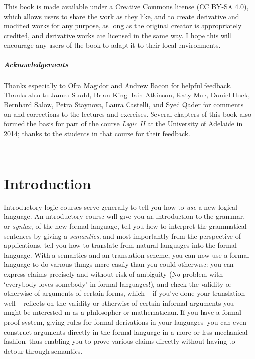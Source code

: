 \documentclass[openany,leqno,11pt,draft]{book}
\theoremstyle{break}
\theoremstyle{definition}
\theoremstyle{remark}
\begin{document}
This book is made available under a Creative Commons license (CC BY-SA 4.0), which allows users to share the work as they like, and to create derivative and modified works for any purpose, as long as the original creator is appropriately credited, and derivative works are licensed in the same way. I hope this will encourage any users of the book to adapt it to their local environments.

\paragraph{Acknowledgements} Thanks especially to Ofra Magidor and Andrew Bacon for helpful feedback. Thanks also to James Studd, Brian King, Iain Atkinson, Katy Moe, Daniel Hoek, Bernhard Salow, Petra Staynova, Laura Castelli, and Syed Qader for comments on and corrections to the lectures and exercises. Several chapters of this book also formed the basis for part of the course \emph{Logic II} at the University of Adelaide in 2014; thanks to the students in that course for their feedback.


  

\newpage\tableofcontents{}
\listoftables\listoffigures




\newpage \thispagestyle{empty} ~\\\newpage


\setcounter{chapter}{-1}
\chapter{Introduction}

Introductory logic courses serve generally to tell you how to \emph{use} a new logical language. An introductory course will give you an introduction to the grammar, or \emph{syntax}, of the new formal language, tell you how to interpret the grammatical sentences by giving a \emph{semantics}, and most importantly from the perspective of applications, tell you how to translate from natural languages into the formal language. With a semantics and an translation scheme, you can now use a formal language to do various things more easily than you could otherwise: you can express claims precisely and without risk of ambiguity (No problem with `everybody loves somebody' in formal languages!), and check the validity or otherwise of arguments of certain forms, which – if you've done your translation well – reflects on the validity or otherwise of certain informal arguments you might be interested in as a philosopher or mathematician. If you have a formal proof system, giving rules for formal derivations in your languages, you can even construct arguments directly in the formal language in a more or less mechanical fashion, thus enabling you to prove various claims directly without having to detour through semantics.
\end{document}
